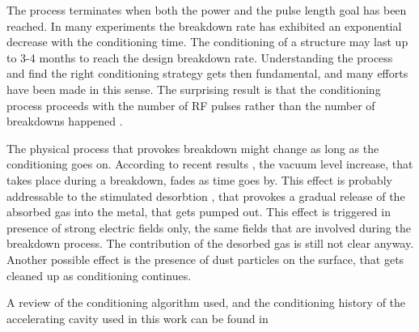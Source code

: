 The process terminates when both the power and the pulse length goal has been reached. In many experiments the breakdown rate has exhibited an exponential decrease with the conditioning time. The conditioning of a structure may last up to 3-4 months to reach the design breakdown rate. Understanding the process and find the right conditioning strategy gets then fundamental, and many efforts have been made in this sense. The surprising result is that the conditioning process proceeds with the number of RF pulses rather than the number of breakdowns happened \cite{Degiovanni:2065711}.

The physical process that provokes breakdown might change as long as the conditioning goes on. According to recent results \cite{Wuensch:583549}, the vacuum level increase, that takes place during a breakdown, fades as time goes by. This effect is probably addressable to the stimulated desorbtion \cite{soviet:1983}, that provokes a gradual release of the absorbed gas into the metal, that gets pumped out. This effect is triggered in presence of strong electric fields only, the same fields that are involved during the breakdown process. The contribution of the desorbed gas is still not clear anyway. Another possible effect is the presence of dust particles on the surface, that gets cleaned up as conditioning continues.

A review of the conditioning algorithm used, and the conditioning history of the accelerating cavity used in this work can be found in \cite{Degiovanni:1742280}










